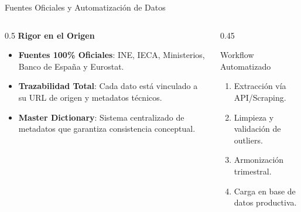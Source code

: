 \documentclass[10pt, aspectratio=169]{beamer}
\begin{document}
\begin{frame}{Fuentes Oficiales y Automatización de Datos}
    \begin{columns}[T]
        \begin{column}{0.5\textwidth}
            \textbf{\textcolor{brandgreen}{Rigor en el Origen}}
            \begin{itemize}
                \item \textbf{Fuentes 100\% Oficiales}: INE, IECA, Ministerios, Banco de España y Eurostat.
                \item \textbf{Trazabilidad Total}: Cada dato está vinculado a su URL de origen y metadatos técnicos.
                \item \textbf{Master Dictionary}: Sistema centralizado de metadatos que garantiza consistencia conceptual.
            \end{itemize}
        \end{column}
        \begin{column}{0.45\textwidth}
            \begin{block}{Workflow Automatizado}
                \scriptsize
                \begin{enumerate}
                    \item Extracción vía API/Scraping.
                    \item Limpieza y validación de outliers.
                    \item Armonización trimestral.
                    \item Carga en base de datos productiva.
                \end{enumerate}
            \end{block}
        \end{column}
    \end{columns}
\end{frame}
\end{document}
